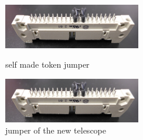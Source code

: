 \documentclass[british,11pt,a4paper]{memoir}
\begin{document}
\begin{figure}[ht]
	\begin{minipage}{6cm}
		\includegraphics[width=6cm]{TokenJumper}
		\caption{self made token jumper}
		\label{p2}
	\end{minipage}
	\hfill
	\begin{minipage}{6cm}
		\includegraphics[width=6cm]{TokenJumper}
		\caption{jumper of the new telescope}
		\label{p3}
	\end{minipage}
\end{figure}
\newpage
\end{document}
